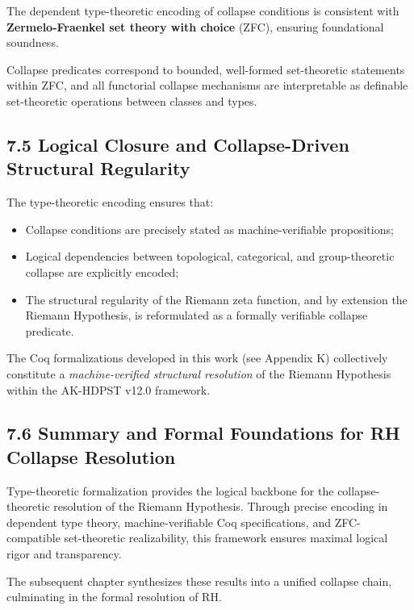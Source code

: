 \documentclass[11pt]{article}
\begin{document}
The dependent type-theoretic encoding of collapse conditions is consistent with \textbf{Zermelo-Fraenkel set theory with choice} (ZFC), ensuring foundational soundness.

Collapse predicates correspond to bounded, well-formed set-theoretic statements within ZFC, and all functorial collapse mechanisms are interpretable as definable set-theoretic operations between classes and types.

\subsection*{7.5 Logical Closure and Collapse-Driven Structural Regularity}

The type-theoretic encoding ensures that:

\begin{itemize}
    \item Collapse conditions are precisely stated as machine-verifiable propositions;
    \item Logical dependencies between topological, categorical, and group-theoretic collapse are explicitly encoded;
    \item The structural regularity of the Riemann zeta function, and by extension the Riemann Hypothesis, is reformulated as a formally verifiable collapse predicate.
\end{itemize}

The Coq formalizations developed in this work (see Appendix K) collectively constitute a \textit{machine-verified structural resolution} of the Riemann Hypothesis within the AK-HDPST v12.0 framework.

\subsection*{7.6 Summary and Formal Foundations for RH Collapse Resolution}

Type-theoretic formalization provides the logical backbone for the collapse-theoretic resolution of the Riemann Hypothesis. Through precise encoding in dependent type theory, machine-verifiable Coq specifications, and ZFC-compatible set-theoretic realizability, this framework ensures maximal logical rigor and transparency.

The subsequent chapter synthesizes these results into a unified collapse chain, culminating in the formal resolution of RH.



\end{document}
